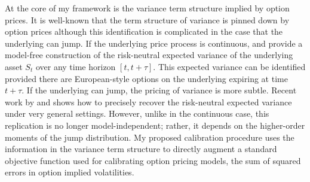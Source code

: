 \documentclass[12pt]{article}
\begin{document}
At the core of my framework is the variance term structure implied by option prices. It is well-known that the term structure of variance is pinned down by option prices although this identification is complicated in the case that the underlying can jump. If the underlying price process is continuous, \cite{neuberger1994log} and \cite{dupire1994pricing} provide a model-free construction of the risk-neutral expected variance of the underlying asset $S_t$ over any time horizon $[t,t+\tau]$. This expected variance can be identified provided there are European-style options on the underlying expiring at time $t+\tau$. If the underlying can jump, the pricing of variance is more subtle. Recent work by \cite{carr2021pricing} and \cite{carr2021robust} shows how to precisely recover the risk-neutral expected variance under very general settings. However, unlike in the continuous case, this replication is no longer model-independent; rather, it depends on the higher-order moments of the jump distribution. My proposed calibration procedure uses the information in the variance term structure to directly augment a standard objective function used for calibrating option pricing models, the sum of squared errors in option implied volatilities. 
\end{document}
